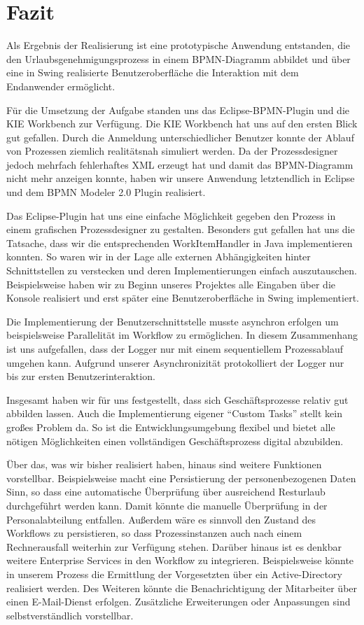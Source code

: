 \section{Fazit}
Als Ergebnis der Realisierung ist eine prototypische Anwendung entstanden, die den Urlaubsgenehmigungsprozess in einem BPMN-Diagramm abbildet und über eine in Swing realisierte Benutzeroberfläche die Interaktion mit dem Endanwender ermöglicht.

Für die Umsetzung der Aufgabe standen uns das Eclipse-BPMN-Plugin und die KIE Workbench zur Verfügung. Die KIE Workbench hat uns auf den ersten Blick gut gefallen. Durch die Anmeldung unterschiedlicher Benutzer konnte der Ablauf von Prozessen ziemlich realitätsnah simuliert werden. Da der Prozessdesigner jedoch mehrfach fehlerhaftes XML erzeugt hat und damit das BPMN-Diagramm nicht mehr anzeigen konnte, haben wir unsere Anwendung letztendlich in Eclipse und dem BPMN Modeler 2.0 Plugin realisiert.

Das Eclipse-Plugin hat uns eine einfache Möglichkeit gegeben den Prozess in einem grafischen Prozessdesigner zu gestalten. Besonders gut gefallen hat uns die Tatsache, dass wir die entsprechenden WorkItemHandler in Java implementieren konnten. So waren wir in der Lage alle externen Abhängigkeiten hinter Schnittstellen zu verstecken und deren Implementierungen einfach auszutauschen. Beispielsweise haben wir zu Beginn unseres Projektes alle Eingaben über die Konsole realisiert und erst später eine Benutzeroberfläche in Swing implementiert.

Die Implementierung der Benutzerschnittstelle musste asynchron erfolgen um beispielsweise Parallelität im Workflow zu ermöglichen. In diesem Zusammenhang ist uns aufgefallen, dass der Logger nur mit einem sequentiellem Prozessablauf umgehen kann. Aufgrund unserer Asynchronizität protokolliert der Logger nur bis zur ersten Benutzerinteraktion.

Insgesamt haben wir für uns festgestellt, dass sich Geschäftsprozesse relativ gut abbilden lassen. Auch die Implementierung eigener "`Custom Tasks"' stellt kein großes Problem da. So ist die Entwicklungsumgebung flexibel und bietet alle nötigen Möglichkeiten einen vollständigen Geschäftsprozess digital abzubilden.

Über das, was wir bisher realisiert haben, hinaus sind weitere Funktionen vorstellbar. Beispielsweise macht eine Persistierung der personenbezogenen Daten Sinn, so dass eine automatische Überprüfung über ausreichend Resturlaub durchgeführt werden kann. Damit könnte die manuelle Überprüfung in der Personalabteilung entfallen. Außerdem wäre es sinnvoll den Zustand des Workflows zu persistieren, so dass Prozessinstanzen auch nach einem Rechnerausfall weiterhin zur Verfügung stehen. Darüber hinaus ist es denkbar weitere Enterprise Services in den Workflow zu integrieren. Beispielsweise könnte in unserem Prozess die Ermittlung der Vorgesetzten über ein Active-Directory realisiert werden. Des Weiteren könnte die Benachrichtigung der Mitarbeiter über einen E-Mail-Dienst erfolgen. Zusätzliche Erweiterungen oder Anpassungen sind selbstverständlich vorstellbar.

